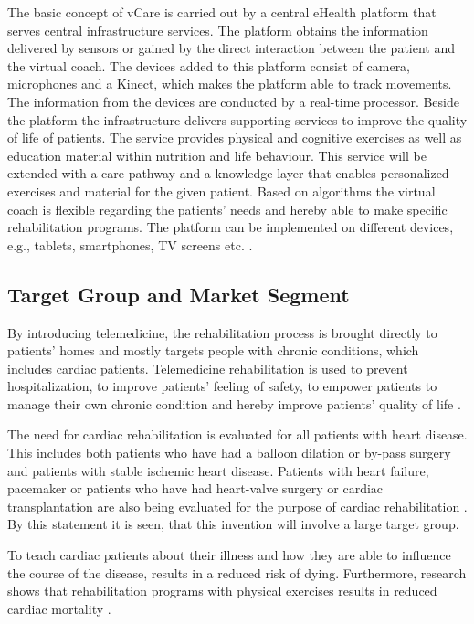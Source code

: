 The basic concept of vCare is carried out by a central eHealth platform that serves central infrastructure services. The platform obtains the information delivered by sensors or gained by the direct interaction between the patient and the virtual coach. The devices added to this platform consist of camera, microphones and a Kinect, which makes the platform able to track movements. The information from the devices are conducted by a real-time processor. Beside the platform the infrastructure delivers supporting services to improve the quality of life of patients. The service provides physical and cognitive exercises as well as education material within nutrition and life behaviour. This service will be extended with a care pathway and a knowledge layer that enables personalized exercises and material for the given patient. Based on algorithms the virtual coach is flexible regarding the patients’ needs and hereby able to make specific rehabilitation programs. The platform can be implemented on different devices, e.g., tablets, smartphones, TV screens etc. \cite{Technical}. 



\subsection{Target Group and Market Segment}

By introducing telemedicine, the rehabilitation process is brought directly to patients' homes and mostly targets people with chronic conditions, which includes cardiac patients. Telemedicine rehabilitation is used to prevent hospitalization, to improve patients' feeling of safety, to empower patients to manage their own chronic condition and hereby improve patients' quality of life \cite{Emergence}. 

The need for cardiac rehabilitation is evaluated for all patients with heart disease. This includes both patients who have had a balloon dilation or by-pass surgery and patients with stable ischemic heart disease.
Patients with heart failure, pacemaker or patients who have had heart-valve surgery or cardiac transplantation are also being evaluated for the purpose of cardiac rehabilitation \cite{Rehabilitering}. By this statement it is seen, that this invention will involve a large target group.

To teach cardiac patients about their illness and how they are able to influence the course of the disease, results in a reduced risk of dying. Furthermore, research shows that rehabilitation programs with physical exercises results in reduced cardiac mortality \cite{Hjerteforening}.    
   

